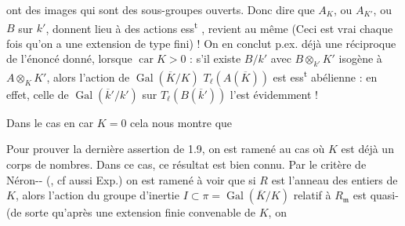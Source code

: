 
ont des images qui sont des sous-groupes ouverts. Donc  dire que $A_K$, ou $A_{K'}$, ou $B$ sur $k'$, donnent lieu à des actions ess\textsuperscript{t}   , revient au même (Ceci est vrai chaque fois qu'on a une extension de type fini\unsure{\ldots}) !  On en conclut p.ex. déjà une réciproque  de l'énoncé donné, lorsque $\operatorname{car} K>0$  : s'il existe $B/k'$ avec $B\otimes_{k'}K'$ isogène à $A\otimes_K K'$, alors l'action de  $\operatorname{Gal}(\overline K/K)$  $T_\ell(A(\overline K))$ est  ess\textsuperscript{t} abélienne : en effet, celle de  \deleted{\unsure{$\xi$}} $\operatorname{Gal}(\overline k'/k')$  sur $T_\ell(B(\overline k'))$ l'est évidemment !

Dans le cas en car $K=0$ cela nous montre que

Pour prouver la dernière assertion de 1.9, on est ramené  au cas où $K$ est déjà un corps de nombres. Dans ce cas,    ce résultat est bien connu. Par   le critère de Néron-- (\unsure{[\quad \S\ S., th.\ 2]|[\quad \S\ S., T.\ 2]}, cf aussi Exp.\quad) on est ramené à voir que si $R$ est l'anneau des entiers de $K$, alors  l'action du groupe d'inertie $I\subset\pi=\operatorname{Gal}(\overline K/K)$ relatif à $R_{\mathfrak m}$ est quasi- (de sorte qu'après une extension finie convenable  de $K$, on
